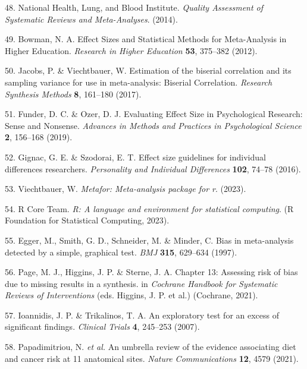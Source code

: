 \documentclass[
  english,
  man]{apa6}
\newenvironment{cslreferences}%
  {}%
  {\par}
\begin{document}
\begin{cslreferences}
\leavevmode\hypertarget{ref-NHLBIQualityAssessmentSystematic2014}{}%
48. National Health, Lung, and Blood Institute. \emph{Quality Assessment of Systematic Reviews and Meta-Analyses}. (2014).

\leavevmode\hypertarget{ref-bowmanEffectSizesStatistical2012}{}%
49. Bowman, N. A. Effect Sizes and Statistical Methods for Meta-Analysis in Higher Education. \emph{Research in Higher Education} \textbf{53}, 375--382 (2012).

\leavevmode\hypertarget{ref-jacobsEstimationBiserialCorrelation2017}{}%
50. Jacobs, P. \& Viechtbauer, W. Estimation of the biserial correlation and its sampling variance for use in meta-analysis: Biserial Correlation. \emph{Research Synthesis Methods} \textbf{8}, 161--180 (2017).

\leavevmode\hypertarget{ref-funderEvaluatingEffectSize2019}{}%
51. Funder, D. C. \& Ozer, D. J. Evaluating Effect Size in Psychological Research: Sense and Nonsense. \emph{Advances in Methods and Practices in Psychological Science} \textbf{2}, 156--168 (2019).

\leavevmode\hypertarget{ref-gignacEffectSizeGuidelines2016}{}%
52. Gignac, G. E. \& Szodorai, E. T. Effect size guidelines for individual differences researchers. \emph{Personality and Individual Differences} \textbf{102}, 74--78 (2016).

\leavevmode\hypertarget{ref-R-metafor}{}%
53. Viechtbauer, W. \emph{Metafor: Meta-analysis package for r}. (2023).

\leavevmode\hypertarget{ref-R-base}{}%
54. R Core Team. \emph{R: A language and environment for statistical computing}. (R Foundation for Statistical Computing, 2023).

\leavevmode\hypertarget{ref-eggerBiasMetaanalysisDetected1997}{}%
55. Egger, M., Smith, G. D., Schneider, M. \& Minder, C. Bias in meta-analysis detected by a simple, graphical test. \emph{BMJ} \textbf{315}, 629--634 (1997).

\leavevmode\hypertarget{ref-pageChapter13Assessing2021}{}%
56. Page, M. J., Higgins, J. P. \& Sterne, J. A. Chapter 13: Assessing risk of bias due to missing results in a synthesis. in \emph{Cochrane Handbook for Systematic Reviews of Interventions} (eds. Higgins, J. P. et al.) (Cochrane, 2021).

\leavevmode\hypertarget{ref-ioannidisExploratoryTestExcess2007}{}%
57. Ioannidis, J. P. \& Trikalinos, T. A. An exploratory test for an excess of significant findings. \emph{Clinical Trials} \textbf{4}, 245--253 (2007).

\leavevmode\hypertarget{ref-papadimitriouUmbrellaReviewEvidence2021}{}%
58. Papadimitriou, N. \emph{et al.} An umbrella review of the evidence associating diet and cancer risk at 11 anatomical sites. \emph{Nature Communications} \textbf{12}, 4579 (2021).
\end{cslreferences}

\newpage
\end{document}
